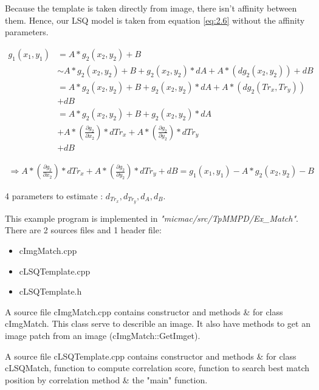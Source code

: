 \documentclass[twoside]{article}
\begin{document}
Because the template is taken directly from image, there isn't affinity between them. Hence, our LSQ model is taken from equation \ref{eq:2.6} without the affinity parameters. 

\begin{equation} 
\begin{aligned}
g_1(x_1,y_1) & = A*g_2(x_2,y_2) + B \\
 			 & \sim A*g_2(x_2,y_2) + B + g_2(x_2,y_2)*dA + A*(dg_2(x_2,y_2)) + dB \\
			 & = A*g_2(x_2,y_2) + B + g_2(x_2,y_2)*dA + A*(dg_2(Tr_x, Tr_y))\\
			 & 
			 + dB \\
			 & = A*g_2(x_2,y_2) + B + g_2(x_2,y_2)*dA \\
			 &
			 + A*(\frac{\partial g_2}{\partial x_2})*dTr_x 
			 + A*(\frac{\partial g_2}{\partial y_2})*dTr_y  \\
			 &
			 + dB
\end{aligned}
\end{equation}

\begin{equation} 
\begin{aligned}
		\Longrightarrow	 A*(\frac{\partial g_2}{\partial x_2})*dTr_x 
			 + A*(\frac{\partial g_2}{\partial y_2})*dTr_y
			 + dB
			 = g_1(x_1,y_1)-A*g_2(x_2,y_2)-B
\end{aligned}
\end{equation}

4 parameters to estimate : $d_{Tr_x}, d_{Tr_y}, d_{A}, d_{B}$.

This example program is implemented in \textit{"micmac/src/TpMMPD/Ex\_Match"}. There are 2 sources files and 1 header file:
\begin{itemize}
  \item cImgMatch.cpp
  \item cLSQTemplate.cpp
  \item cLSQTemplate.h
\end{itemize}
A source file {\color{blue}cImgMatch.cpp} contains constructor and methods \& for class {\color{blue}cImgMatch}. This class serve to describle an image. It also have methods to get an image patch from an image ({\color{orange}cImgMatch::GetImget}).

A source file {\color{blue}cLSQTemplate.cpp} contains constructor and methods \& for class {\color{blue}cLSQMatch}, function to compute correlation score, function to search best match position by correlation method \& the "main" function.
\end{document}
